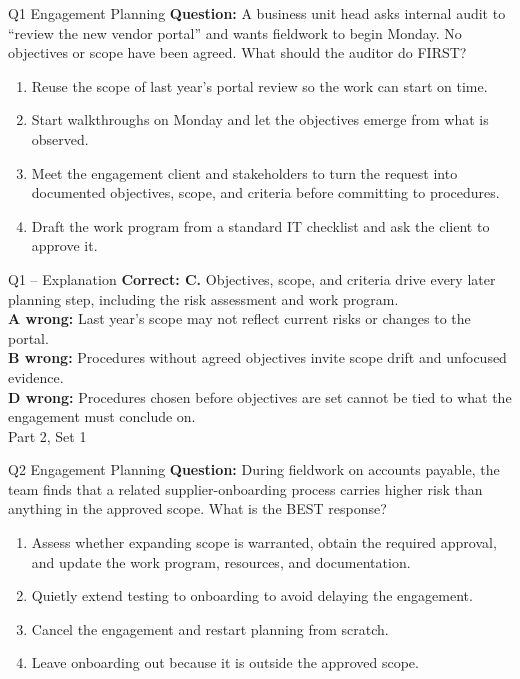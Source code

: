 \documentclass[aspectratio=169,10pt]{beamer}
\begin{document}
\begin{frame}[t]{Q1 \hfill {\scriptsize Engagement Planning}}
	\small
	\textbf{Question:} A business unit head asks internal audit to ``review the new vendor portal'' and wants fieldwork to begin Monday. No objectives or scope have been agreed. What should the auditor do FIRST?
	\begin{enumerate}[label=\Alph*.,itemsep=1pt,topsep=3pt]
			\item Reuse the scope of last year's portal review so the work can start on time.
			\item Start walkthroughs on Monday and let the objectives emerge from what is observed.
			\item Meet the engagement client and stakeholders to turn the request into documented objectives, scope, and criteria before committing to procedures.
			\item Draft the work program from a standard IT checklist and ask the client to approve it.
	\end{enumerate}
\end{frame}
\begin{frame}[t]{Q1 -- Explanation}
	\footnotesize
	\textbf{Correct: C.} Objectives, scope, and criteria drive every later planning step, including the risk assessment and work program. \\[5pt]
\textbf{A wrong:} Last year's scope may not reflect current risks or changes to the portal. \\[3pt]
\textbf{B wrong:} Procedures without agreed objectives invite scope drift and unfocused evidence. \\[3pt]
\textbf{D wrong:} Procedures chosen before objectives are set cannot be tied to what the engagement must conclude on. \\[3pt]
	\vfill {\tiny Part 2, Set 1}
\end{frame}
\begin{frame}[t]{Q2 \hfill {\scriptsize Engagement Planning}}
	\small
	\textbf{Question:} During fieldwork on accounts payable, the team finds that a related supplier-onboarding process carries higher risk than anything in the approved scope. What is the BEST response?
	\begin{enumerate}[label=\Alph*.,itemsep=1pt,topsep=3pt]
			\item Assess whether expanding scope is warranted, obtain the required approval, and update the work program, resources, and documentation.
			\item Quietly extend testing to onboarding to avoid delaying the engagement.
			\item Cancel the engagement and restart planning from scratch.
			\item Leave onboarding out because it is outside the approved scope.
	\end{enumerate}
\end{frame}
\end{document}
